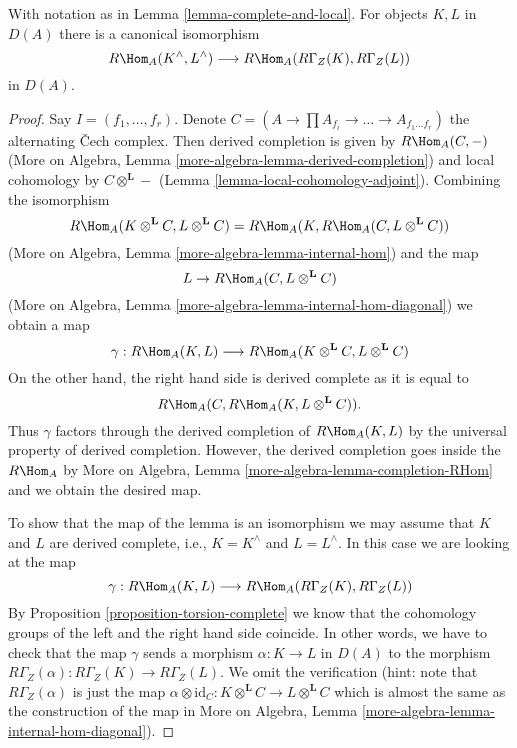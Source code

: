 \begin{lemma}
\label{lemma-compare-RHom}
With notation as in Lemma \ref{lemma-complete-and-local}.
For objects $K, L$ in $D(A)$ there is a canonical isomorphism
$$
R\Hom_A(K^\wedge, L^\wedge) \longrightarrow R\Hom_A(R\Gamma_Z(K), R\Gamma_Z(L))
$$
in $D(A)$.
\end{lemma}

\begin{proof}
Say $I = (f_1, \ldots, f_r)$. Denote
$C = (A \to \prod A_{f_i} \to \ldots \to A_{f_1 \ldots f_r})$ the
alternating {\v C}ech complex. Then derived completion is given by
$R\Hom_A(C, -)$ (More on Algebra, Lemma
\ref{more-algebra-lemma-derived-completion}) and local cohomology by
$C \otimes^\mathbf{L} -$ (Lemma \ref{lemma-local-cohomology-adjoint}).
Combining the isomorphism
$$
R\Hom_A(K \otimes^\mathbf{L} C, L \otimes^\mathbf{L} C) =
R\Hom_A(K, R\Hom_A(C,  L \otimes^\mathbf{L} C))
$$
(More on Algebra, Lemma \ref{more-algebra-lemma-internal-hom})
and the map
$$
L \to R\Hom_A(C,  L \otimes^\mathbf{L} C)
$$
(More on Algebra, Lemma \ref{more-algebra-lemma-internal-hom-diagonal})
we obtain a map
$$
\gamma :
R\Hom_A(K, L)
\longrightarrow
R\Hom_A(K \otimes^\mathbf{L} C, L \otimes^\mathbf{L} C)
$$
On the other hand, the right hand side is derived complete as it is
equal to
$$
R\Hom_A(C, R\Hom_A(K, L \otimes^\mathbf{L} C)).
$$
Thus $\gamma$ factors through the derived completion of
$R\Hom_A(K, L)$ by the universal property of derived completion.
However, the derived completion goes inside the $R\Hom_A$ by
More on Algebra, Lemma \ref{more-algebra-lemma-completion-RHom}
and we obtain the desired map.

\medskip\noindent
To show that the map of the lemma is an isomorphism
we may assume that $K$ and $L$ are derived complete, i.e.,
$K = K^\wedge$ and $L = L^\wedge$. In this case we are
looking at the map
$$
\gamma : R\Hom_A(K, L) \longrightarrow R\Hom_A(R\Gamma_Z(K), R\Gamma_Z(L))
$$
By Proposition \ref{proposition-torsion-complete} we know that
the cohomology groups
of the left and the right hand side coincide. In other words,
we have to check that the map $\gamma$ sends a morphism
$\alpha : K \to L$ in $D(A)$ to the morphism
$R\Gamma_Z(\alpha) : R\Gamma_Z(K) \to R\Gamma_Z(L)$.
We omit the verification (hint: note that $R\Gamma_Z(\alpha)$
is just the map
$\alpha \otimes \text{id}_C :
K \otimes^\mathbf{L} C
\to
L \otimes^\mathbf{L} C$ which is almost the same as the
construction of the map in
More on Algebra, Lemma \ref{more-algebra-lemma-internal-hom-diagonal}).
\end{proof}










